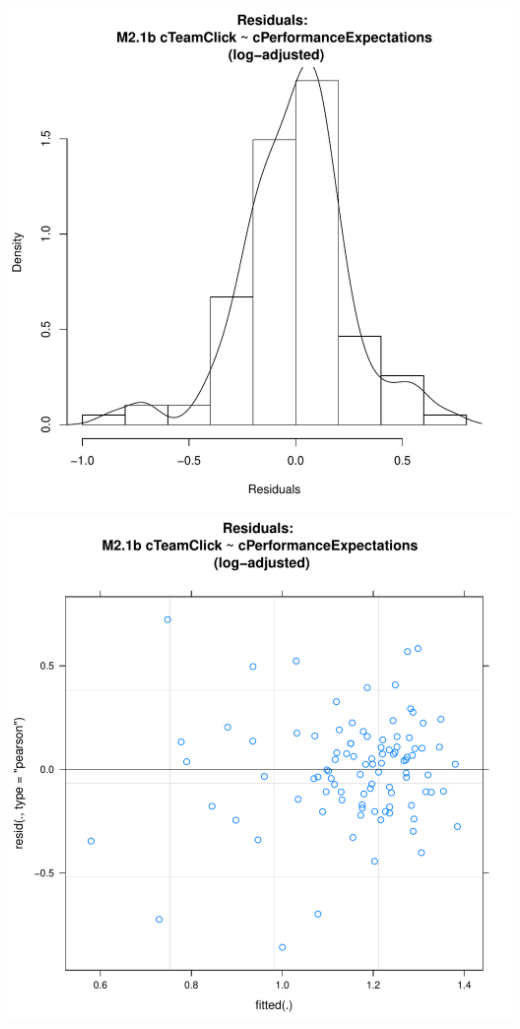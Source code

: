 \documentclass[12pt]{report}
\begin{document}
\centering
\newpage
\includegraphics[scale =.4]{../images/MLM21bLogHist.pdf}
\includegraphics[scale =.4]{../images/MLM21bLogScatter.pdf}
\end{document}
